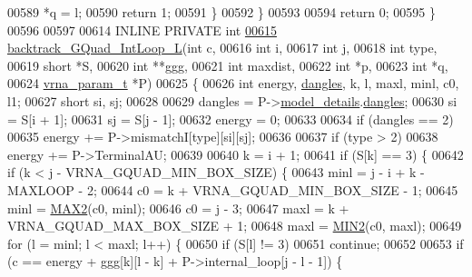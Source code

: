 \begin{DoxyCode}
00589         *q  = l;
00590         \textcolor{keywordflow}{return} 1;
00591       \}
00592     \}
00593 
00594   \textcolor{keywordflow}{return} 0;
00595 \}
00596 
00597 
00614 INLINE PRIVATE \textcolor{keywordtype}{int}
\hyperlink{group__gquads_ga7b371308fa5a45c7ac353ef6ed1014de}{00615} \hyperlink{group__gquads_ga7b371308fa5a45c7ac353ef6ed1014de}{backtrack\_GQuad\_IntLoop\_L}(\textcolor{keywordtype}{int}           c,
00616                           \textcolor{keywordtype}{int}           i,
00617                           \textcolor{keywordtype}{int}           j,
00618                           \textcolor{keywordtype}{int}           type,
00619                           \textcolor{keywordtype}{short}         *S,
00620                           \textcolor{keywordtype}{int}           **ggg,
00621                           \textcolor{keywordtype}{int}           maxdist,
00622                           \textcolor{keywordtype}{int}           *p,
00623                           \textcolor{keywordtype}{int}           *q,
00624                           \hyperlink{group__energy__parameters_structvrna__param__s}{vrna\_param\_t}  *P)
00625 \{
00626   \textcolor{keywordtype}{int}   energy, \hyperlink{group__model__details_ga72b511ed1201f7e23ec437e468790d74}{dangles}, k, l, maxl, minl, c0, l1;
00627   \textcolor{keywordtype}{short} si, sj;
00628 
00629   dangles = P->\hyperlink{group__energy__parameters_a7b84353eb9075c595bad4ceb871bcae7}{model\_details}.\hyperlink{group__model__details_adcda4ff2ea77748ae0e8700288282efc}{dangles};
00630   si      = S[i + 1];
00631   sj      = S[j - 1];
00632   energy  = 0;
00633 
00634   \textcolor{keywordflow}{if} (dangles == 2)
00635     energy += P->mismatchI[type][si][sj];
00636 
00637   \textcolor{keywordflow}{if} (type > 2)
00638     energy += P->TerminalAU;
00639 
00640   k = i + 1;
00641   \textcolor{keywordflow}{if} (S[k] == 3) \{
00642     \textcolor{keywordflow}{if} (k < j - VRNA\_GQUAD\_MIN\_BOX\_SIZE) \{
00643       minl  = j - i + k - MAXLOOP - 2;
00644       c0    = k + VRNA\_GQUAD\_MIN\_BOX\_SIZE - 1;
00645       minl  = \hyperlink{group__utils_ga33297b3679c713b0c4d897cd0fe3b122}{MAX2}(c0, minl);
00646       c0    = j - 3;
00647       maxl  = k + VRNA\_GQUAD\_MAX\_BOX\_SIZE + 1;
00648       maxl  = \hyperlink{group__utils_gae0b9cd0ce090bd69b951aa73e8fa4f7d}{MIN2}(c0, maxl);
00649       \textcolor{keywordflow}{for} (l = minl; l < maxl; l++) \{
00650         \textcolor{keywordflow}{if} (S[l] != 3)
00651           \textcolor{keywordflow}{continue};
00652 
00653         \textcolor{keywordflow}{if} (c == energy + ggg[k][l - k] + P->internal\_loop[j - l - 1]) \{

\end{DoxyCode}
